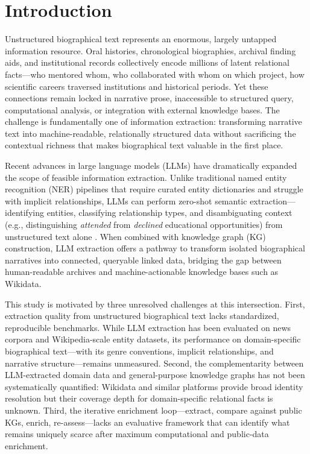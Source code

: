 \documentclass[review]{elsarticle}
\begin{document}
\section{Introduction}

Unstructured biographical text represents an enormous, largely untapped information resource. Oral histories, chronological biographies, archival finding aids, and institutional records collectively encode millions of latent relational facts—who mentored whom, who collaborated with whom on which project, how scientific careers traversed institutions and historical periods. Yet these connections remain locked in narrative prose, inaccessible to structured query, computational analysis, or integration with external knowledge bases. The challenge is fundamentally one of information extraction: transforming narrative text into machine-readable, relationally structured data without sacrificing the contextual richness that makes biographical text valuable in the first place.

Recent advances in large language models (LLMs) have dramatically expanded the scope of feasible information extraction. Unlike traditional named entity recognition (NER) pipelines that require curated entity dictionaries and struggle with implicit relationships, LLMs can perform zero-shot semantic extraction—identifying entities, classifying relationship types, and disambiguating context (e.g., distinguishing \textit{attended} from \textit{declined} educational opportunities) from unstructured text alone \cite{pan2023unifying}. When combined with knowledge graph (KG) construction, LLM extraction offers a pathway to transform isolated biographical narratives into connected, queryable linked data, bridging the gap between human-readable archives and machine-actionable knowledge bases such as Wikidata.

This study is motivated by three unresolved challenges at this intersection. First, extraction quality from unstructured biographical text lacks standardized, reproducible benchmarks. While LLM extraction has been evaluated on news corpora and Wikipedia-scale entity datasets, its performance on domain-specific biographical text—with its genre conventions, implicit relationships, and narrative structure—remains unmeasured. Second, the complementarity between LLM-extracted domain data and general-purpose knowledge graphs has not been systematically quantified: Wikidata and similar platforms provide broad identity resolution but their coverage depth for domain-specific relational facts is unknown. Third, the iterative enrichment loop—extract, compare against public KGs, enrich, re-assess—lacks an evaluative framework that can identify what remains uniquely scarce after maximum computational and public-data enrichment.
\end{document}
